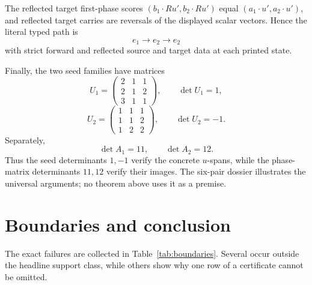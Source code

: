\documentclass[11pt]{article}
\theoremstyle{definition}
\theoremstyle{remark}
\begin{document}
The reflected target first-phase scores
\((b_1\cdot Ru',b_2\cdot Ru')\) equal
\((a_1\cdot u',a_2\cdot u')\), and reflected target carries are reversals
of the displayed scalar vectors.  Hence the literal typed path is
\[
 e_1\longrightarrow e_2\longrightarrow e_2
\]
with strict forward and reflected source and target data at each printed
state.

Finally, the two seed families have matrices
\[
 U_1=\begin{pmatrix}2&1&1\\2&1&2\\3&1&1\end{pmatrix},
 \qquad \det U_1=1,
\]
\[
 U_2=\begin{pmatrix}1&1&1\\1&1&2\\1&2&2\end{pmatrix},
 \qquad \det U_2=-1.
\tag{7.14}
\]
Separately,
\[
 \det A_1=11,\qquad \det A_2=12.
\tag{7.15}
\]
Thus the seed determinants \(1,-1\) verify the concrete \(u\)-spans, while
the phase-matrix determinants \(11,12\) verify their images.  The six-pair
dossier illustrates the universal arguments; no theorem above uses it as a
premise.

\section{Boundaries and conclusion}

The exact failures are collected in Table~\ref{tab:boundaries}.  Several
occur outside the headline support class, while others show why one row of
a certificate cannot be omitted.
\end{document}
